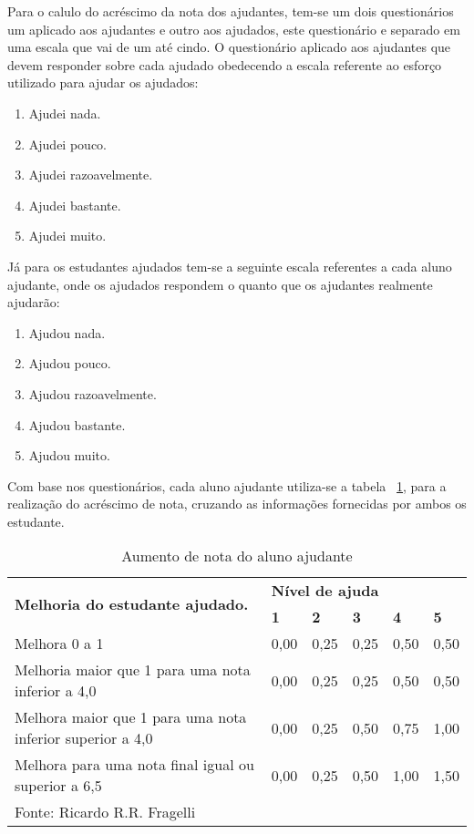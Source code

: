 Para o calulo do acréscimo da nota dos ajudantes, tem-se um dois questionários um aplicado aos ajudantes e outro aos ajudados, este questionário e separado em uma escala que vai de um até cindo. O questionário aplicado aos ajudantes que devem responder sobre cada ajudado obedecendo a escala referente ao esforço utilizado para ajudar os ajudados: 
\begin{enumerate} 
\item Ajudei nada. 
\item Ajudei pouco. 
\item Ajudei razoavelmente. 
\item Ajudei bastante. 
\item Ajudei muito. 
\end{enumerate} 
Já para os estudantes ajudados tem-se a seguinte escala referentes a cada aluno ajudante, onde os ajudados respondem o quanto que os ajudantes realmente ajudarão: 
\begin{enumerate} 
\item Ajudou nada. 
\item Ajudou pouco. 
\item Ajudou razoavelmente. 
\item Ajudou bastante. 
\item Ajudou muito. 
\end{enumerate} 

Com base nos questionários, cada aluno ajudante utiliza-se a tabela ~\ref{tabelaAjudante}, para a realização do acréscimo de nota, cruzando as informações fornecidas por ambos os estudante.

\begin{table}[h]
    \centering
    \caption{Aumento de nota do aluno ajudante}
    \label{tabelaAjudante}
    \begin{tabular}{@{}lllllll@{}}
    \toprule
    \multicolumn{2}{l}{\multirow{2}{*}{\textbf{Melhoria do estudante ajudado.}}}  & \multicolumn{5}{l}{\textbf{Nível de ajuda}}                    \\ \cmidrule(l){3-7} 
    \multicolumn{2}{l}{}                                                          & \textbf{1} & \textbf{2} & \textbf{3} & \textbf{4} & \textbf{5} \\ \midrule
    \multicolumn{2}{l}{Melhora 0 a 1}                                             & 0,00       & 0,25       & 0,25       & 0,50       & 0,50       \\
    \multicolumn{2}{l}{Melhoria maior que 1 para uma nota inferior a 4,0}         & 0,00       & 0,25       & 0,25       & 0,50       & 0,50       \\
    \multicolumn{2}{l}{Melhora maior que 1 para uma nota inferior superior a 4,0} & 0,00       & 0,25       & 0,50       & 0,75       & 1,00       \\
    \multicolumn{2}{l}{Melhora para uma nota final igual ou superior a 6,5}       & 0,00       & 0,25       & 0,50       & 1,00       & 1,50       \\ \midrule
    \multicolumn{7}{l}{Fonte: Ricardo R.R. Fragelli}                                                                                              
    \end{tabular}
    \end{table}
